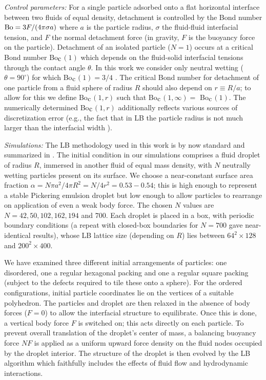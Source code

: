 \documentclass[aps,prl,superscriptaddress,twocolumn,showpacs,floatfix]{revtex4-1}
\newcommand{\Bocm}{Bo$_{\hbox{\rm c}}$}
\begin{document}
\textit{Control parameters:}
For a single particle adsorbed onto a flat horizontal interface between two fluids of equal density, detachment is controlled by the Bond number \cite{clift:1979/a}
${\rm Bo}= {3}{F}/ {(4\pi\sigma a)} $
where $a$ is the particle radius, $\sigma$ the fluid-fluid interfacial tension, and $F$ the normal detachment force (in gravity, $F$ is the buoyancy force on the particle).
Detachment of an isolated particle ($N=1$) occurs at a critical Bond number \Bocm $(1)$ which depends on the fluid-solid interfacial tensions through the contact angle $\theta$. In this work we consider only neutral wetting ($\theta  = 90^\circ$) for which \Bocm $(1)= 3/4$ \cite{stratford:2005/a,derjaguin:1946/a}. The critical Bond number for detachment of one particle from a fluid sphere of radius $R$ should also depend on $r\equiv R/a$; to allow for this we define \Bocm $(1,r)$ such that \Bocm $(1,\infty) =$ \Bocm $(1)$.  The numerically determined \Bocm $(1,r)$ additionally reflects various sources of discretization error (e.g., the fact that in LB the particle radius is not much larger than the interfacial width \cite{supmat}).

\textit{Simulations:}
The LB methodology used in this work is by now standard \cite{kim:one,stratford:2005/a,Bounce} and summarized in \cite{supmat}.
The initial condition in our simulations comprises a fluid droplet of radius $R$, immersed in another fluid of equal mass density, with $N$ neutrally wetting particles present on its surface. We choose a near-constant surface area fraction $\alpha=N\pi a^2/4\pi R^2 = N/ 4r^2 = 0.53-0.54$; this is high enough to represent a stable Pickering emulsion droplet but low enough to allow particles to rearrange on application of even a weak body force. The chosen $N$ values are $N=42,50,102,162,194$ and $700$.
Each droplet is placed in a box, with periodic boundary conditions (a repeat with closed-box boundaries for $N=700$ gave near-identical results), whose LB lattice size (depending on $R$) lies between $64^2 \times 128$ and $200^2\times 400$. 

We have examined three different initial arrangements of particles: one disordered, one a regular hexagonal packing and one a regular square packing (subject to the defects required to tile these onto a sphere). For the ordered configurations, initial particle coordinates lie on the vertices of a suitable polyhedron. 
The particles and droplet are then relaxed in the absence of body forces ($F=0$) to allow the interfacial structure to equilibrate.
Once this is done, a vertical body force $F$ is switched on; this acts directly on each particle. To prevent overall translation of the droplet's center of mass, a balancing buoyancy force $NF$ is applied as a uniform upward force density
on the fluid nodes occupied by the droplet interior. The structure of the droplet is then evolved by the LB algorithm which faithfully includes the effects of fluid flow and hydrodynamic interactions.
\end{document}
